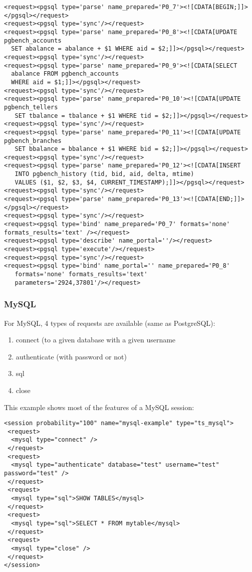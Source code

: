 \documentclass{TSUNG-en}
\begin{document}
\begin{Verbatim}
<request><pgsql type='parse' name_prepared='P0_7'><![CDATA[BEGIN;]]></pgsql></request>
<request><pgsql type='sync'/></request>
<request><pgsql type='parse' name_prepared='P0_8'><![CDATA[UPDATE pgbench_accounts
  SET abalance = abalance + $1 WHERE aid = $2;]]></pgsql></request>
<request><pgsql type='sync'/></request>
<request><pgsql type='parse' name_prepared='P0_9'><![CDATA[SELECT
  abalance FROM pgbench_accounts
  WHERE aid = $1;]]></pgsql></request>
<request><pgsql type='sync'/></request>
<request><pgsql type='parse' name_prepared='P0_10'><![CDATA[UPDATE pgbench_tellers
   SET tbalance = tbalance + $1 WHERE tid = $2;]]></pgsql></request>
<request><pgsql type='sync'/></request>
<request><pgsql type='parse' name_prepared='P0_11'><![CDATA[UPDATE pgbench_branches
   SET bbalance = bbalance + $1 WHERE bid = $2;]]></pgsql></request>
<request><pgsql type='sync'/></request>
<request><pgsql type='parse' name_prepared='P0_12'><![CDATA[INSERT
   INTO pgbench_history (tid, bid, aid, delta, mtime)
   VALUES ($1, $2, $3, $4, CURRENT_TIMESTAMP);]]></pgsql></request>
<request><pgsql type='sync'/></request>
<request><pgsql type='parse' name_prepared='P0_13'><![CDATA[END;]]></pgsql></request>
<request><pgsql type='sync'/></request>
<request><pgsql type='bind' name_prepared='P0_7' formats='none' formats_results='text' /></request>
<request><pgsql type='describe' name_portal=''/></request>
<request><pgsql type='execute'/></request>
<request><pgsql type='sync'/></request>
<request><pgsql type='bind' name_portal='' name_prepared='P0_8'
   formats='none' formats_results='text'
   parameters='2924,37801'/></request>
\end{Verbatim}

\subsubsection{MySQL}
\label{sec:session:mysql}
For MySQL, 4 types of requests are available (same as PostgreSQL):
\begin{enumerate}
\item connect (to a given database with a given username
\item authenticate (with password or not)
\item sql
\item close
\end{enumerate}

This example shows most of the features of a MySQL session:

\begin{Verbatim}
<session probability="100" name="mysql-example" type="ts_mysql">
 <request>
  <mysql type="connect" />
 </request>
 <request>
  <mysql type="authenticate" database="test" username="test" password="test" />
 </request>
 <request>
  <mysql type="sql">SHOW TABLES</mysql>
 </request>
 <request>
  <mysql type="sql">SELECT * FROM mytable</mysql>
 </request>
 <request>
  <mysql type="close" />
 </request>
</session>
\end{Verbatim}
\end{document}

